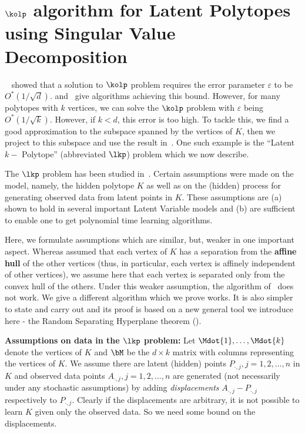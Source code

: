 
\section{$\kolp$ algorithm for Latent Polytopes using Singular Value Decomposition}
\label{sec:lkp}

~ showed that a solution to $\kolp$ problem requires the error parameter $\varepsilon$ to be $O^*(1/\sqrt{d})$.  and~ give algorithms achieving this bound. However, for many polytopes with $k$ vertices, we can solve the $\kolp$ problem with $\varepsilon$ being $O^*(1/\sqrt{k})$. However, if $k<d$, this error is too high. To tackle this, we find a good approximation to the subspace spanned by the vertices of $K$, 
then we project to this subspace and use the result in~. 
One such example is the ``Latent $k-$ Polytope'' (abbreviated $\lkp$) problem which we now describe.

The $\lkp$ problem has been studied in~\cite{BhattacharyyaK20}. Certain assumptions were made on the model, namely, the hidden polytope $K$ as well as on the (hidden) process for generating observed data from latent points in $K$. These assumptions are (a) shown to hold in several important Latent Variable models and (b) are sufficient to enable one to get polynomial time learning algorithms.

Here, we formulate assumptions which are similar, but, weaker in one important aspect. Whereas \cite{BhattacharyyaK20} assumed that each vertex of $K$ has a separation from the {\bf affine hull} of the other vertices (thus, in particular, each vertex is affinely independent of other vertices), we assume here that each vertex is separated only from the convex hull of the others. Under this weaker assumption, the algorithm of~\cite{BhattacharyyaK20} does not work. We give a different algorithm which we prove works. It is also simpler to state and carry out and its proof is based on a new general tool we introduce here - the Random Separating Hyperplane theorem ().  

\noindent
{\bf Assumptions on data in the $\lkp$ problem:} 
Let $\Mdot{1}, \ldots, \Mdot{k}$ denote the vertices of $K$ and $\bM$ be the $d \times k$ matrix with columns representing the vertices of $K$.  
We assume there are latent (hidden) points $P_{\cdot ,j}, j=1,2,\ldots ,n$ in $K$ and observed data points $A_{\cdot,j}, j=1,2,\ldots ,n$ are generated (not necessarily under any stochastic assumptions) by adding {\it displacements} $A_{\cdot,j}-P_{\cdot,j}$ respectively to $P_{\cdot,j}$. Clearly if the displacements are arbitrary, it is not possible to learn $K$ given only the observed data. So we need some bound on the displacements. 

